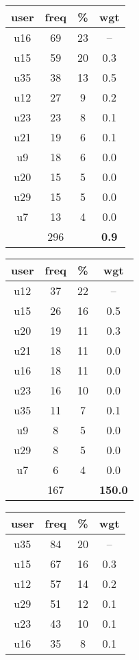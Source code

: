 \begin{appendices}
\begin{table}
\centering
\begin{tabular}{ |c|c|c|c| }
	\hline
	\textbf{user} & \textbf{freq} & \textbf{\%} & \textbf{wgt} \\
	\hline
	u16 & 69 & 23 & -- \\
	u15 & 59 & 20 & 0.3 \\
	u35 & 38 & 13 & 0.5 \\
	u12 & 27 & 9 & 0.2 \\
	u23 & 23 & 8 & 0.1 \\
	u21 & 19 & 6 & 0.1 \\
	u9 & 18 & 6 & 0.0 \\
	u20 & 15 & 5 & 0.0 \\
	u29 & 15 & 5 & 0.0 \\
	u7 & 13 & 4 & 0.0 \\
	 & 296 & & \textbf{0.9} \\
	\hline
\end{tabular}
\begin{tabular}{ |c|c|c|c| }
	\hline
	\textbf{user} & \textbf{freq} & \textbf{\%} & \textbf{wgt} \\
	\hline
	u12 & 37 & 22 & -- \\
	u15 & 26 & 16 & 0.5 \\
	u20 & 19 & 11 & 0.3 \\
	u21 & 18 & 11 & 0.0 \\
	u16 & 18 & 11 & 0.0 \\
	u23 & 16 & 10 & 0.0 \\
	u35 & 11 & 7 & 0.1 \\
	u9 & 8 & 5 & 0.0 \\
	u29 & 8 & 5 & 0.0 \\
	u7 & 6 & 4 & 0.0 \\
	 & 167 & & \textbf{150.0} \\
	\hline
\end{tabular}
\begin{tabular}{ |c|c|c|c| }
	\hline
	\textbf{user} & \textbf{freq} & \textbf{\%} & \textbf{wgt} \\
	\hline
	u35 & 84 & 20 & -- \\
	u15 & 67 & 16 & 0.3 \\
	u12 & 57 & 14 & 0.2 \\
	u29 & 51 & 12 & 0.1 \\
	u23 & 43 & 10 & 0.1 \\
	u16 & 35 & 8 & 0.1 \\

\end{tabular}
\end{table}
\end{appendices}
